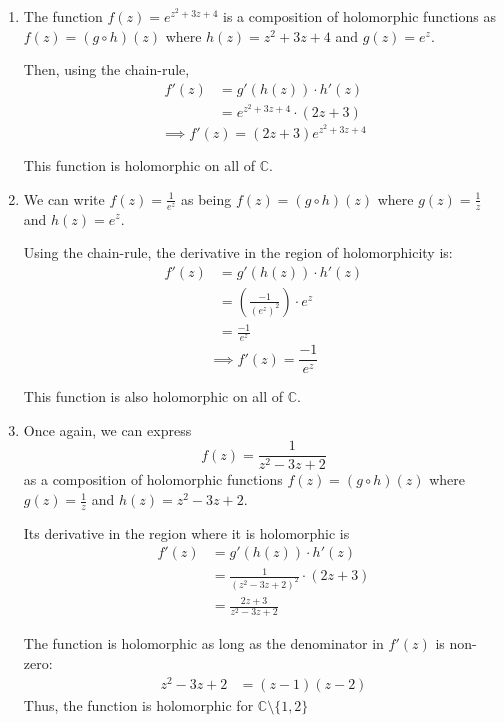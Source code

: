 \documentclass{article}
\newcommand{\C}{\mathbb{C}}
\begin{document}
\begin{enumerate}[label=(\alph*)]
  \item The function $f(z) = e^{z^2 + 3z + 4}$ is a composition of holomorphic functions as $f(z) = (g \circ h)(z)$ where $h(z) = z^2 + 3z + 4$ and $g(z) = e^{z}$.

  \vskip 0.5cm
  Then, using the chain-rule, 
  \begin{align*}
    f'(z) &= g'(h(z)) \cdot h'(z) \\
    &= e^{z^2 + 3z + 4} \cdot (2z + 3)
  \end{align*}
  \[ \implies \boxed{ f'(z) = (2z + 3)e^{z^2 + 3z + 4} } \]

  This function is holomorphic on all of $\C$.

  \vskip 0.5cm
  \item We can write $f(z) = \frac{1}{e^z}$ as being $f(z) = (g \circ h)(z)$ where $g(z) = \frac{1}{z}$ and $h(z) = e^{z}$.
  

  \vskip 0.5cm
  Using the chain-rule, the derivative in the region of holomorphicity is: 
  \begin{align*}
    f'(z) &= g'(h(z)) \cdot h'(z) \\
    &= \left(\frac{-1}{(e^z)^2}\right) \cdot e^{z} \\
    &= \frac{-1}{e^z}
  \end{align*}
  \[ \implies \boxed{ f'(z) = \frac{-1}{e^z} } \]
  
  This function is also holomorphic on all of $\C$.

  \vskip 0.5cm
  \item Once again, we can express
  \[ f(z) = \frac{1}{z^2 - 3z + 2} \]
  as a composition of holomorphic functions $f(z) = (g \circ h)(z)$ where $g(z) = \frac{1}{z}$ and $h(z) = z^2 - 3z + 2$.


  \vskip 0.25cm
  Its derivative in the region where it is holomorphic is 
  \begin{align*}
    f'(z) &= g'(h(z)) \cdot h'(z) \\
    &= \frac{1}{(z^2 - 3z + 2)^2} \cdot (2z + 3) \\
    &= \frac{2z + 3}{z^2 - 3z + 2}
  \end{align*}
  
  The function is holomorphic as long as the denominator in $f'(z)$ is non-zero: 
  \begin{align*}
    z^2 - 3z + 2 &= (z-1)(z-2)
  \end{align*}
  Thus, the function is holomorphic for $\C \setminus \{1, 2\}$

\end{enumerate}
\end{document}
